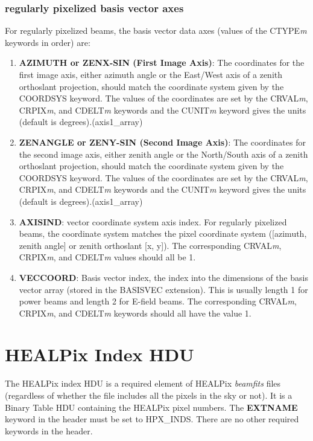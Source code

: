 \documentclass[11pt, oneside]{article}   	%
\begin{document}
\subsubsection{regularly pixelized basis vector axes}
For regularly pixelized beams, the basis vector data axes (values of the CTYPE\textit{m} keywords in order) are:

\begin{enumerate}
\item{\textbf{AZIMUTH or ZENX-SIN (First Image Axis)}: The coordinates for the first image axis, either azimuth angle or the East/West axis of a zenith orthoslant projection, should match the coordinate system given by the COORDSYS keyword. The values of the coordinates are set by the CRVAL\textit{m}, CRPIX\textit{m}, and CDELT\textit{m} keywords and the CUNIT\textit{m} keyword gives the units (default is degrees).(axis1\_array)}
\item{\textbf{ZENANGLE or ZENY-SIN (Second Image Axis)}: The coordinates for the second image axis, either zenith angle or the North/South axis of a zenith orthoslant projection, should match the coordinate system given by the COORDSYS keyword. The values of the coordinates are set by the CRVAL\textit{m}, CRPIX\textit{m}, and CDELT\textit{m} keywords and the CUNIT\textit{m} keyword gives the units (default is degrees).(axis1\_array)}
\item{\textbf{AXISIND}: vector coordinate system axis index. For regularly pixelized beams, the coordinate system matches the pixel coordinate system ([azimuth, zenith angle] or zenith orthoslant [x, y]). The corresponding CRVAL\textit{m}, CRPIX\textit{m}, and CDELT\textit{m} values should all be 1.}
\item{\textbf{VECCOORD}: Basis vector index, the index into the dimensions of the basis vector array (stored in the BASISVEC extension). This is usually length 1 for power beams and length 2 for E-field beams. The corresponding CRVAL\textit{m}, CRPIX\textit{m}, and CDELT\textit{m} keywords should all have the value 1.}
\end{enumerate}

\section{HEALPix Index HDU}
The HEALPix index HDU is a required element of HEALPix \textit{beamfits} files (regardless of whether the file includes all the pixels in the sky or not). It is a Binary Table HDU containing the HEALPix pixel numbers.
The \textbf{EXTNAME} keyword in the header must be set to HPX\_INDS. There are no other required keywords in the header.
\end{document}
